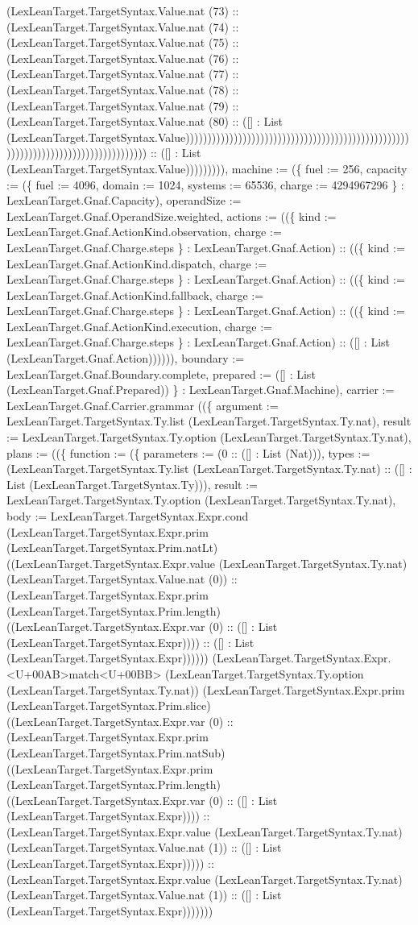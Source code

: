 \documentclass[11pt]{article}
\begin{document}
(LexLeanTarget.TargetSyntax.Value.nat (73) :: (LexLeanTarget.TargetSyntax.Value.nat (74) :: (LexLeanTarget.TargetSyntax.Value.nat (75) :: (LexLeanTarget.TargetSyntax.Value.nat (76) :: (LexLeanTarget.TargetSyntax.Value.nat (77) :: (LexLeanTarget.TargetSyntax.Value.nat (78) :: (LexLeanTarget.TargetSyntax.Value.nat (79) :: (LexLeanTarget.TargetSyntax.Value.nat (80) :: ([] : List (LexLeanTarget.TargetSyntax.Value))))))))))))))))))))))))))))))))))))))))))))))))))))))))))))))))))))))))))))))))))) :: ([] : List (LexLeanTarget.TargetSyntax.Value))))))))), machine := (\{ fuel := 256, capacity := (\{ fuel := 4096, domain := 1024, systems := 65536, charge := 4294967296 \} : LexLeanTarget.Gnaf.Capacity), operandSize := LexLeanTarget.Gnaf.OperandSize.weighted, actions := ((\{ kind := LexLeanTarget.Gnaf.ActionKind.observation, charge := LexLeanTarget.Gnaf.Charge.steps \} : LexLeanTarget.Gnaf.Action) :: ((\{ kind := LexLeanTarget.Gnaf.ActionKind.dispatch, charge := LexLeanTarget.Gnaf.Charge.steps \} : LexLeanTarget.Gnaf.Action) :: ((\{ kind := LexLeanTarget.Gnaf.ActionKind.fallback, charge := LexLeanTarget.Gnaf.Charge.steps \} : LexLeanTarget.Gnaf.Action) :: ((\{ kind := LexLeanTarget.Gnaf.ActionKind.execution, charge := LexLeanTarget.Gnaf.Charge.steps \} : LexLeanTarget.Gnaf.Action) :: ([] : List (LexLeanTarget.Gnaf.Action)))))), boundary := LexLeanTarget.Gnaf.Boundary.complete, prepared := ([] : List (LexLeanTarget.Gnaf.Prepared)) \} : LexLeanTarget.Gnaf.Machine), carrier := LexLeanTarget.Gnaf.Carrier.grammar ((\{ argument := LexLeanTarget.TargetSyntax.Ty.list (LexLeanTarget.TargetSyntax.Ty.nat), result := LexLeanTarget.TargetSyntax.Ty.option (LexLeanTarget.TargetSyntax.Ty.nat), plans := ((\{ function := (\{ parameters := (0 :: ([] : List (Nat))), types := (LexLeanTarget.TargetSyntax.Ty.list (LexLeanTarget.TargetSyntax.Ty.nat) :: ([] : List (LexLeanTarget.TargetSyntax.Ty))), result := LexLeanTarget.TargetSyntax.Ty.option (LexLeanTarget.TargetSyntax.Ty.nat), body := LexLeanTarget.TargetSyntax.Expr.cond (LexLeanTarget.TargetSyntax.Expr.prim (LexLeanTarget.TargetSyntax.Prim.natLt) ((LexLeanTarget.TargetSyntax.Expr.value (LexLeanTarget.TargetSyntax.Ty.nat) (LexLeanTarget.TargetSyntax.Value.nat (0)) :: (LexLeanTarget.TargetSyntax.Expr.prim (LexLeanTarget.TargetSyntax.Prim.length) ((LexLeanTarget.TargetSyntax.Expr.var (0) :: ([] : List (LexLeanTarget.TargetSyntax.Expr)))) :: ([] : List (LexLeanTarget.TargetSyntax.Expr)))))) (LexLeanTarget.TargetSyntax.Expr.<U+00AB>match<U+00BB> (LexLeanTarget.TargetSyntax.Ty.option (LexLeanTarget.TargetSyntax.Ty.nat)) (LexLeanTarget.TargetSyntax.Expr.prim (LexLeanTarget.TargetSyntax.Prim.slice) ((LexLeanTarget.TargetSyntax.Expr.var (0) :: (LexLeanTarget.TargetSyntax.Expr.prim (LexLeanTarget.TargetSyntax.Prim.natSub) ((LexLeanTarget.TargetSyntax.Expr.prim (LexLeanTarget.TargetSyntax.Prim.length) ((LexLeanTarget.TargetSyntax.Expr.var (0) :: ([] : List (LexLeanTarget.TargetSyntax.Expr)))) :: (LexLeanTarget.TargetSyntax.Expr.value (LexLeanTarget.TargetSyntax.Ty.nat) (LexLeanTarget.TargetSyntax.Value.nat (1)) :: ([] : List (LexLeanTarget.TargetSyntax.Expr))))) :: (LexLeanTarget.TargetSyntax.Expr.value (LexLeanTarget.TargetSyntax.Ty.nat) (LexLeanTarget.TargetSyntax.Value.nat (1)) :: ([] : List (LexLeanTarget.TargetSyntax.Expr))))))) 
\end{document}
